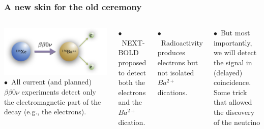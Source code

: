 \begin{frame}
\frametitle{A new skin for the old ceremony}
\begin{columns}
\includegraphics[scale=0.2]{img/bariumTagging.png}
$\bullet$~All current (and planned) $\beta \beta 0 \nu$ experiments detect only the electromagnetic part of the decay (e.g., the electrons). 

$\bullet$~NEXT-BOLD proposed to detect both the electrons and the $Ba^{2+}$ dication. 
 
$\bullet$~Radioactivity produces electrons but not isolated $Ba^{2+}$ dications. 

$\bullet$~But most importantly, we will detect the signal in (delayed) coincidence. \alert{Some trick that allowed the discovery of the neutrino}

\end{columns}
\end{frame}

